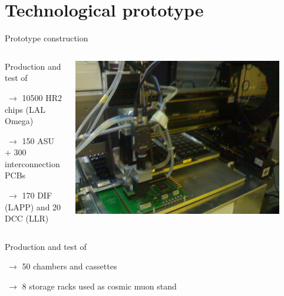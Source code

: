 \documentclass[10pt]{beamer}
\begin{document}
\section{ Technological prototype}
\begin{frame}[shrink=3]{Prototype construction}
  \begin{block}

    \begin{columns}

      \begin{column}{0.5\textwidth}
        \begin{block}
        { 
          Production and test of 
          \par $ ~\rightarrow$ 10500 HR2 chips  (LAL Omega)
          \par $ ~\rightarrow$  150 ASU + 300 interconnection PCBs
          \par $ ~ \rightarrow$ 170 DIF (LAPP) and 20 DCC (LLR)
        }
        \end{block}
      \end{column}
      
      \begin{column}{0.5\textwidth}
        \centerline{\includegraphics[width=0.9\textwidth]{jpg/ConstructionGantry.jpg}}
      \end{column}
    \end{columns}
  \end{block}
\begin{block}

    \begin{columns}

      \begin{column}{0.5\textwidth}
        \begin{block}
        {
          Production and test of 
          \par $ ~\rightarrow$ 50 chambers and cassettes
          \par $ ~\rightarrow$ 8 storage racks used as cosmic muon stand 
        }
        \end{block}
      \end{column}
      

\end{columns}
\end{block}
\end{frame}
\end{document}
